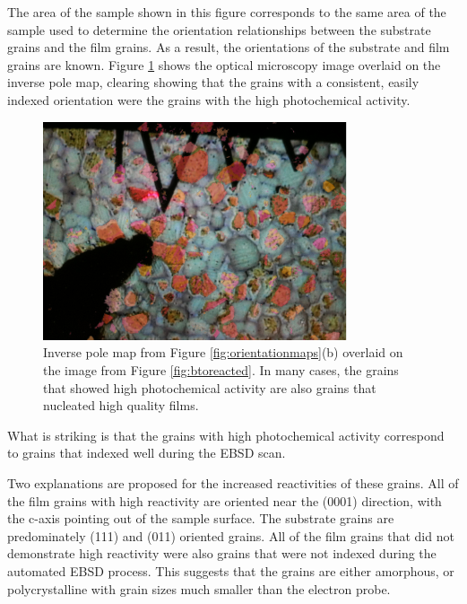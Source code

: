 The area of the sample shown in this figure corresponds to the same area of the sample used to determine the orientation relationships between the substrate grains and the film grains. As a result, the orientations of the substrate and film grains are known. Figure \ref{fig:btooverlay} shows the optical microscopy image overlaid on the inverse pole map, clearing showing that the grains with a consistent, easily indexed orientation were the grains with the high photochemical activity.
\begin{figure}[htbp]
\begin{center}
\includegraphics[width=0.8\textwidth]{btooverlay.pdf}
\caption[Inverse pole map overlaid on the image from Figure \ref{fig:btoreacted}]{Inverse pole map from Figure \ref{fig:orientationmaps}(b) overlaid on the image from Figure \ref{fig:btoreacted}. In many cases, the grains that showed high photochemical activity are also grains that nucleated high quality  films.}
\label{fig:btooverlay} %
\end{center}
\end{figure}
What is striking is that the grains with high photochemical activity correspond to grains that indexed well during the EBSD scan. 

Two explanations are proposed for the increased reactivities of these grains. All of the film grains with high reactivity are oriented near the (0001) direction, with the c-axis pointing out of the sample surface. The substrate grains are predominately (111) and (011) oriented grains. All of the film grains that did not demonstrate high reactivity were also grains that were not indexed during the automated EBSD process. This suggests that the grains are either amorphous, or polycrystalline with grain sizes much smaller than the electron probe. 


